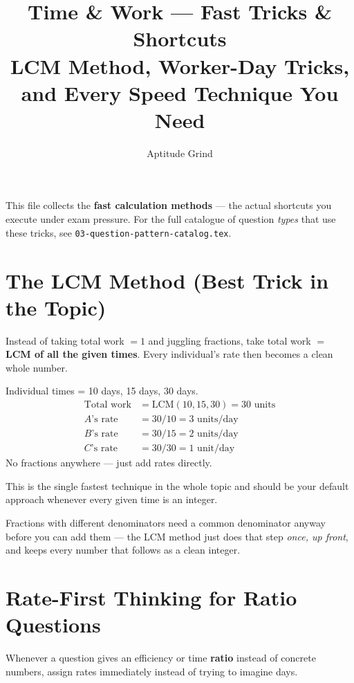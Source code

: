 \documentclass[11pt]{article}
\title{\color{primary}\textbf{Time \& Work --- Fast Tricks \& Shortcuts}\\[4pt]\large LCM Method, Worker-Day Tricks, and Every Speed Technique You Need}
\author{Aptitude Grind}
\date{}
\begin{document}
\maketitle
\thispagestyle{fancy}

\noindent This file collects the \textbf{fast calculation methods} --- the actual shortcuts you
execute under exam pressure. For the full catalogue of question \emph{types} that use these tricks,
see \texttt{03-question-pattern-catalog.tex}.

\section{The LCM Method (Best Trick in the Topic)}
Instead of taking total work $=1$ and juggling fractions, take total work $=$ \textbf{LCM of all the
given times}. Every individual's rate then becomes a clean whole number.

\begin{examplebox}
Individual times = 10 days, 15 days, 30 days.
\begin{align*}
\text{Total work} &= \text{LCM}(10,15,30) = 30 \text{ units} \\
A\text{'s rate} &= 30/10 = 3 \text{ units/day} \\
B\text{'s rate} &= 30/15 = 2 \text{ units/day} \\
C\text{'s rate} &= 30/30 = 1 \text{ unit/day}
\end{align*}
No fractions anywhere --- just add rates directly.
\end{examplebox}

This is the single fastest technique in the whole topic and should be your default approach whenever
every given time is an integer.

\begin{tipbox}
Fractions with different denominators need a common denominator anyway before you can add them ---
the LCM method just does that step \emph{once, up front}, and keeps every number that follows as a
clean integer.
\end{tipbox}

\section{Rate-First Thinking for Ratio Questions}
Whenever a question gives an efficiency or time \textbf{ratio} instead of concrete numbers, assign
rates immediately instead of trying to imagine days.
\end{document}
